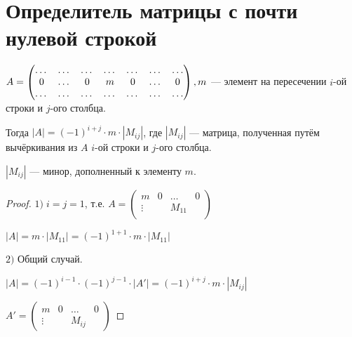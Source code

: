 \section{Определитель матрицы с почти нулевой строкой}

\begin{theorem-non} $\quad$ \\
    $A =
    \begin{pmatrix}
        \dots & \dots & \dots & \dots & \dots & \dots & \dots \\
        0 & \dots & 0 & m & 0 & \dots & 0 \\
        \dots & \dots & \dots & \dots & \dots & \dots & \dots
    \end{pmatrix}, \\
    m$ --- элемент на пересечении $i$-ой строки и $j$-ого столбца.
    
    Тогда
    $|A| = (-1)^{i+j} \cdot m \cdot |M_{ij}|$,
    где $|M_{ij}|$ --- матрица, полученная путём вычёркивания из $A$
    $i$-ой строки и $j$-ого столбца.
    
    $|M_{ij}|$ --- минор, дополненный к элементу $m$.
    
    \begin{proof}
        $1)\; i = j = 1$, т.е.
        $A =
    \begin{pmatrix}
        m & 0 & \dots & 0 \\
        \vdots & & M_{11} &  \\
    \end{pmatrix}$ 
    
        $|A| = m \cdot |M_{11}| = (-1)^{1 + 1} \cdot m \cdot |M_{11}|$
    
        $2)$ Общий случай.
        
        $|A| = (-1)^{i -1} \cdot (-1)^{j - 1} \cdot |A'| = (-1)^{i + j} \cdot m \cdot |M_{ij}|$
    
        $A' = 
        \begin{pmatrix}
            m & 0 & \dots & 0 \\
            \vdots & & M_{ij} & 
        \end{pmatrix}$
    \end{proof}
    \end{theorem-non}